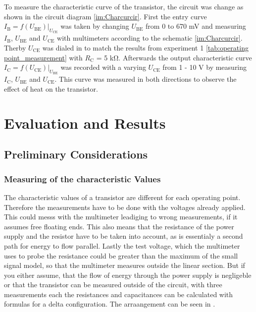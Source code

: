 \documentclass[11pt, a4paper]{article}
\begin{document}
To measure the characteristic curve of the transistor, the circuit was change as shown in the circuit diagram \ref{im:Charcurcir}. 
First the entry curve $I_{\text{B}}=f(U_{\text{BE}})|_{U_{\text{CE}}}$ was taken by changing $U_{\text{BE}}$ from 0 to 670 \si{\milli\volt} and measuring $I_{\text{B}}$,
$U_{\text{BE}}$ and $U_{\text{CE}}$ with multimeters according to the schematic \ref{im:Charcurcir}. Therby $U_{\text{CE}}$ was dialed in to match the results from experiment 1 \ref{tab:operating point_measurement} with $R_{\text{C}}$ = 5 \si{\kilo\ohm}.
Afterwards the output characteristic curve $I_{\text{C}} = f(U_{\text{CE}})|_{U_{\text{BE}}}$ was recorded with a varying $U_{\text{CE}}$ from 1 - 10 \si{\volt} by measuring $I_{\text{C}}$, $U_{\text{BE}}$ and $U_{\text{CE}}$. This curve was measured in both directions to observe the effect of heat on the transistor.

\section{Evaluation and Results}
\FloatBarrier
\subsection{Preliminary Considerations}

\subsubsection{Measuring of the characteristic Values}
The characteristic values of a transistor are different for each operating point. Therefore the measurements have to be done with the voltages already applied. This could messs with the multimeter leadiging to wrong measurements, if it assumes free floating ends. This also means that the resistance of the power supply and the resistor have to be taken into account, as is essentialy a second path for energy to flow parallel. Lastly the test voltage, which the multimeter uses to probe the resistance could be greater than the maximum of the small signal model, so that the multimeter measures outside the linear section. But if you either assume, that the flow of energy through the power supply is negligeble or that the transistor can be measured outside of the circuit, with three measurements each the resistances and capacitances can be calculated with formulas for a delta configuration. The arraangement can be seen in \cite[figure 11]{TRA}.
\end{document}
